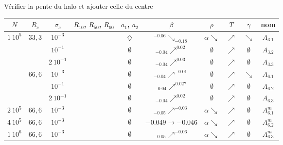 \begin{table}[htbp]
	Vérifier la pente du halo et ajouter celle du centre
	\centering
		\begin{tabular}{|c|c|c|c|c|c|c|c|c|c|}
			\hline $N$ & $R_c$ & $\sigma_c$ & $R_{10}$, $R_{50}$, $R_{90}$ & $a_1$, $a_2$ & $\beta$ & $\rho$ & $T$ & $\gamma$ & nom \tabularnewline
			\hline
			\hline \multirow{6}{*}{$1\ 10^5$} & \multirow{3}{*}{$33,3$}
			& $10^{-3}$ & \accretionmoyen{} & $\diamondsuit$ & ${}^{-0.06}\searrow_{-0.18}$ & $\alpha\searrow$ & $\nearrow$ & $\searrow$ & $A_{3.1}$ \tabularnewline \cline{3-10}
					& & $10^{-1}$ & \accretionpeu{} & $\emptyset$ & ${}_{-0.04}\nearrow^{0.02}$ & $\emptyset$ & $\nearrow$ & $\emptyset$ & $A_{3.2}$  \tabularnewline \cline{3-10}
					& & $2\ 10^{-1}$ & \accretionpeu{} & $\emptyset$ & ${}_{-0.04}\nearrow^{0.03}$ & $\emptyset$ & $\nearrow$ & $\emptyset$ & $A_{3.3}$  \tabularnewline \cline{2-10}
				& \multirow{3}{*}{$66,6$}
					& $10^{-3}$ & \accretionpeu{} & $\emptyset$ & ${}_{-0.04}\nearrow^{-0.01}$ & $\emptyset$ & $\nearrow$ & $\searrow$ & $A_{6.1}$  \tabularnewline \cline{3-10}
					& & $10^{-1}$ & \accretionpeu{} & $\emptyset$ & ${}_{-0.04}\nearrow^{0.027}$ & $\emptyset$ & $\nearrow$ & $\emptyset$ & $A_{6.2}$  \tabularnewline \cline{3-10}
					& & $2\ 10^{-1}$ & \accretionpeu{} & $\emptyset$ & ${}_{-0.04}\nearrow^{0.02}$ & $\emptyset$ & $\nearrow$ & $\emptyset$ & $A_{6.3}$  \tabularnewline \cline{2-10}
			\hline
			\hline $2\ 10^5$ & $66,6$ & $10^{-3}$ & \accretionpeu{} & $\emptyset$ & ${}_{-0.05}\nearrow^{-0.03}$ & $\alpha\searrow$ & $\nearrow$ & $\emptyset$ & $A_{6.1}^m$  \\
			\hline
			\hline $4\ 10^5$ & $66,6$ & $10^{-3}$ & \accretionpeu{} & $\emptyset$ & ${\scriptstyle -0.049}\to{\scriptstyle -0.046}$ & $\alpha\searrow$ & $\nearrow$ & $\emptyset$ & $A_{6.2}^m$  \\
			\hline
			\hline $1\ 10^6$ & $66,6$ & $10^{-3}$ & \accretionpeu{} & $\emptyset$ & ${}_{-0.05}\nearrow^{-0.06}$ & $\alpha\searrow$ & $\nearrow$ & $\emptyset$ & $A_{6.3}^m$  \\

\end{tabular}
\end{table}
